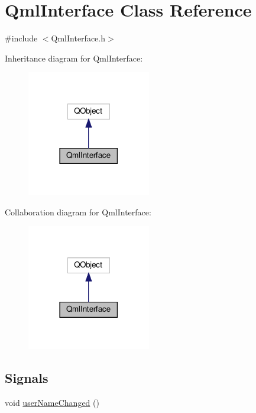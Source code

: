 \hypertarget{class_qml_interface}{}\section{Qml\+Interface Class Reference}
\label{class_qml_interface}


{\ttfamily \#include $<$Qml\+Interface.\+h$>$}



Inheritance diagram for Qml\+Interface\+:
\nopagebreak
\begin{figure}[H]
\begin{center}
\leavevmode
\includegraphics[width=153pt]{class_qml_interface__inherit__graph}
\end{center}
\end{figure}


Collaboration diagram for Qml\+Interface\+:
\nopagebreak
\begin{figure}[H]
\begin{center}
\leavevmode
\includegraphics[width=153pt]{class_qml_interface__coll__graph}
\end{center}
\end{figure}
\subsection*{Signals}
\begin{DoxyCompactItemize}
\item 
void \hyperlink{class_qml_interface_ad18453c22bf39b2cdc5dd0bcca5b1bd4}{user\+Name\+Changed} ()
\end{DoxyCompactItemize}
